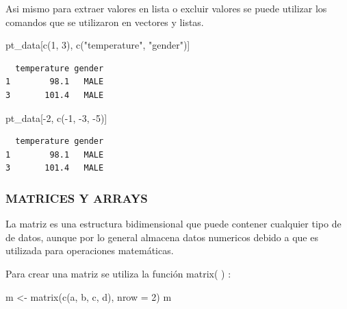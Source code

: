 \documentclass[
  letterpaper,
  DIV=11,
  numbers=noendperiod]{scrartcl}
\newenvironment{Shaded}{\begin{snugshade}}{\end{snugshade}}
\newcommand{\AttributeTok}[1]{\textcolor[rgb]{0.40,0.45,0.13}{#1}}
\newcommand{\DecValTok}[1]{\textcolor[rgb]{0.68,0.00,0.00}{#1}}
\newcommand{\FunctionTok}[1]{\textcolor[rgb]{0.28,0.35,0.67}{#1}}
\newcommand{\NormalTok}[1]{\textcolor[rgb]{0.00,0.23,0.31}{#1}}
\newcommand{\OtherTok}[1]{\textcolor[rgb]{0.00,0.23,0.31}{#1}}
\newcommand{\SpecialCharTok}[1]{\textcolor[rgb]{0.37,0.37,0.37}{#1}}
\newcommand{\StringTok}[1]{\textcolor[rgb]{0.13,0.47,0.30}{#1}}
\begin{document}
Asi mismo para extraer valores en lista o excluir valores se puede
utilizar los comandos que se utilizaron en vectores y listas.

\begin{Shaded}
\begin{Highlighting}[]
\NormalTok{pt\_data[}\FunctionTok{c}\NormalTok{(}\DecValTok{1}\NormalTok{, }\DecValTok{3}\NormalTok{), }\FunctionTok{c}\NormalTok{(}\StringTok{"temperature"}\NormalTok{, }\StringTok{"gender"}\NormalTok{)]}
\end{Highlighting}
\end{Shaded}

\begin{verbatim}
  temperature gender
1        98.1   MALE
3       101.4   MALE
\end{verbatim}

\begin{Shaded}
\begin{Highlighting}[]
\NormalTok{pt\_data[}\SpecialCharTok{{-}}\DecValTok{2}\NormalTok{, }\FunctionTok{c}\NormalTok{(}\SpecialCharTok{{-}}\DecValTok{1}\NormalTok{, }\SpecialCharTok{{-}}\DecValTok{3}\NormalTok{, }\SpecialCharTok{{-}}\DecValTok{5}\NormalTok{)]}
\end{Highlighting}
\end{Shaded}

\begin{verbatim}
  temperature gender
1        98.1   MALE
3       101.4   MALE
\end{verbatim}

\hypertarget{matrices-y-arrays}{%
\subsubsection{MATRICES Y ARRAYS}\label{matrices-y-arrays}}

La matriz es una estructura bidimensional que puede contener cualquier
tipo de de datos, aunque por lo general almacena datos numericos debido
a que es utilizada para operaciones matemáticas.

Para crear una matriz se utiliza la función matrix( ) :

\begin{Shaded}
\begin{Highlighting}[]
\NormalTok{m }\OtherTok{\textless{}{-}} \FunctionTok{matrix}\NormalTok{(}\FunctionTok{c}\NormalTok{(}\StringTok{\textquotesingle{}a\textquotesingle{}}\NormalTok{, }\StringTok{\textquotesingle{}b\textquotesingle{}}\NormalTok{, }\StringTok{\textquotesingle{}c\textquotesingle{}}\NormalTok{, }\StringTok{\textquotesingle{}d\textquotesingle{}}\NormalTok{), }\AttributeTok{nrow =} \DecValTok{2}\NormalTok{)}
\NormalTok{m}
\end{Highlighting}
\end{Shaded}
\end{document}
